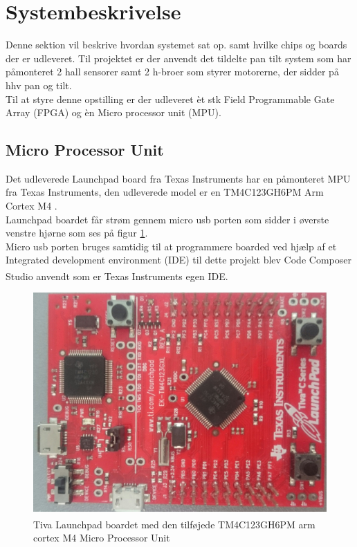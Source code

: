 \section{Systembeskrivelse}
Denne sektion vil beskrive hvordan systemet sat op. samt hvilke chips og boards der er udleveret.
Til projektet er der anvendt det tildelte pan tilt system som har påmonteret 2 hall sensorer samt 2 h-broer som styrer motorerne, der sidder på hhv pan og tilt.\\
Til at styre denne opstilling er der udleveret èt stk Field Programmable Gate Array (FPGA) og èn Micro processor unit (MPU).
\\
\subsection{Micro Processor Unit}
Det udleverede Launchpad board fra Texas Instruments har en påmonteret MPU fra Texas Instruments, den udleverede model er en TM4C123GH6PM Arm Cortex M4 \cite{TM4C123GH6PMDatasheet}.\\
Launchpad boardet får strøm gennem micro usb porten som sidder i øverste venstre hjørne som ses på figur \ref{fig:TivaLaunchPad}.\\
Micro usb porten bruges samtidig til at programmere boarded ved hjælp af et Integrated development environment (IDE) til dette projekt blev Code Composer Studio \textsuperscript{\texttrademark} anvendt som er Texas Instruments egen IDE.

\begin{figure}[!ht]
	\begin{center}
		\includegraphics[scale=0.1, angle =270]{Billeder/TivaLaunchPad.JPG}
	\end{center}
\caption{Tiva\textsuperscript{\texttrademark} Launchpad boardet med den tilføjede TM4C123GH6PM arm cortex M4 Micro Processor Unit}
\label{fig:TivaLaunchPad}
\end{figure}


